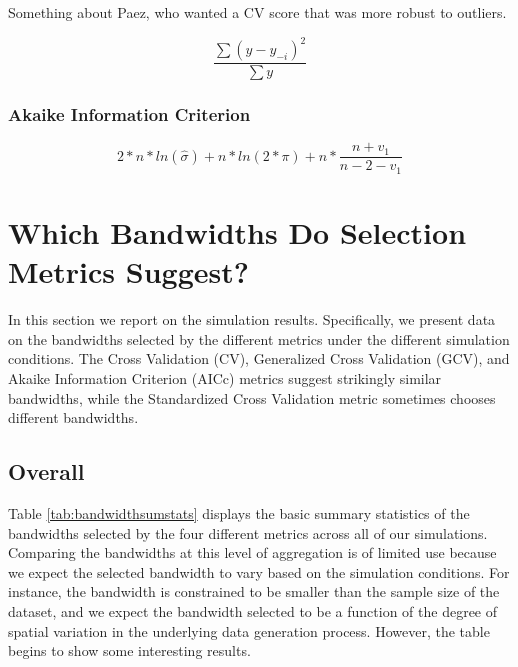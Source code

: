 \documentclass{article}\usepackage{graphicx, color}
\begin{document}
Something about Paez, who wanted a CV score that was more robust to outliers.

\begin{equation}\label{eq:SCV}
\frac{\sum (y - y_{-i})^2} {\sum y}
\end{equation}

\subsubsection{Akaike Information Criterion}

\begin{equation}\label{eq:AIC}
  2*n*ln(\hat{\sigma}) + n*ln(2*\pi) + 
    n*\frac{n + v_1}{n - 2 - v_1}
    \end{equation}


\section{Which Bandwidths Do Selection Metrics Suggest?}
In this section we report on the simulation results. Specifically, we present data on the bandwidths selected by the different metrics under the different simulation conditions. The Cross Validation (CV), Generalized Cross Validation (GCV), and Akaike Information Criterion (AICc) metrics suggest strikingly similar bandwidths, while the Standardized Cross Validation metric sometimes chooses different bandwidths.

\subsection{Overall}

Table \ref{tab:bandwidthsumstats} displays the basic summary statistics of the bandwidths selected by the four different metrics across all of our simulations. Comparing the bandwidths at this level of aggregation is of limited use because we expect the selected bandwidth to vary based on the simulation conditions. For instance, the bandwidth is constrained to be smaller than the sample size of the dataset, and we expect the bandwidth selected to be a function of the degree of spatial variation in the underlying data generation process. However, the table begins to show some interesting results.
\end{document}
